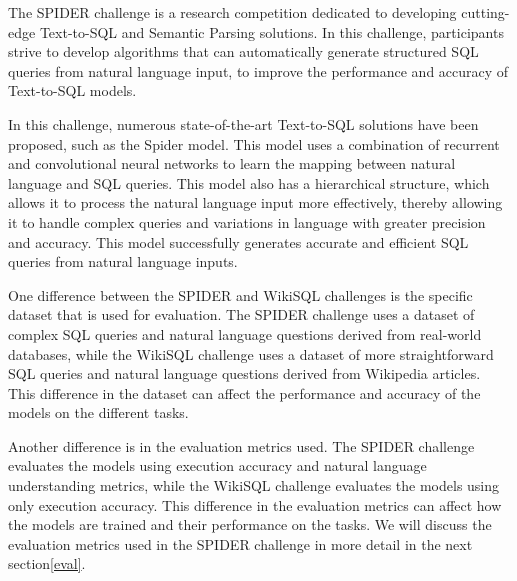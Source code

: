The SPIDER challenge is a research competition dedicated to developing cutting-edge Text-to-SQL and Semantic Parsing solutions. In this challenge, participants strive to develop algorithms that can automatically generate structured SQL queries from natural language input, to improve the performance and accuracy of Text-to-SQL models.

In this challenge, numerous state-of-the-art Text-to-SQL solutions have been proposed, such as the Spider model. This model uses a combination of recurrent and convolutional neural networks to learn the mapping between natural language and SQL queries. This model also has a hierarchical structure, which allows it to process the natural language input more effectively, thereby allowing it to handle complex queries and variations in language with greater precision and accuracy. This model successfully generates accurate and efficient SQL queries from natural language inputs.

One difference between the SPIDER and WikiSQL challenges is the specific dataset that is used for evaluation. The SPIDER challenge uses a dataset of complex SQL queries and natural language questions derived from real-world databases, while the WikiSQL challenge uses a dataset of more straightforward SQL queries and natural language questions derived from Wikipedia articles. This difference in the dataset can affect the performance and accuracy of the models on the different tasks.

Another difference is in the evaluation metrics used. The SPIDER challenge evaluates the models using execution accuracy and natural language understanding metrics, while the WikiSQL challenge evaluates the models using only execution accuracy. This difference in the evaluation metrics can affect how the models are trained and their performance on the tasks. We will discuss the evaluation metrics used in the SPIDER challenge in more detail in the next section\ref{eval}.